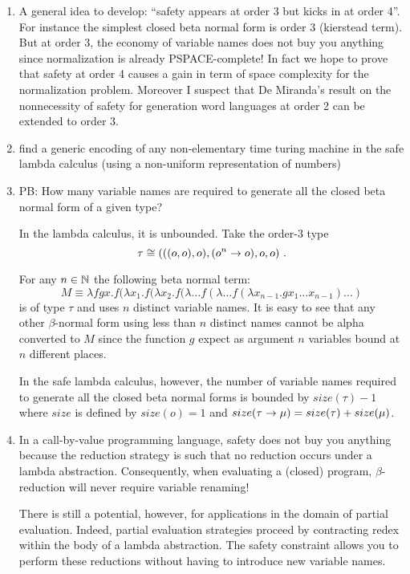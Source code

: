 \documentclass{article}
\begin{document}
\begin{enumerate}

\item A general idea to develop: ``safety appears at order 3 but kicks in at order 4''. For instance the simplest closed beta normal form is order 3 (kierstead term). But at order 3, the economy of variable names does not buy you anything since normalization is already PSPACE-complete! In fact we hope to prove that safety at order 4 causes a gain in term of space complexity for the normalization problem.
    Moreover I suspect that De Miranda's result on the nonnecessity of safety for generation word languages at order 2 can be extended to order 3.


\item find a generic encoding of any non-elementary time turing machine
in the safe lambda calculus (using a non-uniform representation of
numbers)


\item \label{safe_varnames} PB: How many variable names are required to generate all the
closed beta normal form of a given type?

In the lambda calculus, it is unbounded. Take the order-3 type
$$\tau
\cong (((o,o),o), (o^n\rightarrow o), o, o) \ . $$

For any $n\in\mathbb{N}$ the following beta normal term:
$$ M \equiv \lambda f g x . f (\lambda x_1.f(\lambda x_2.f(\lambda \ldots f(\lambda \ldots f(\lambda x_{n-1}.g x_1 \ldots x_{n-1}) \ldots )$$
is of type $\tau$ and uses $n$ distinct variable names. It is easy to see that
any other $\beta$-normal form using less than $n$ distinct names cannot be alpha converted to $M$
since the function $g$ expect as argument $n$ variables bound at $n$ different places.


In the safe lambda calculus, however, the number of variable names
required to generate all the closed beta normal forms is bounded by
$size(\tau)-1$ where $size$ is defined by $size(o)= 1$ and
$size(\tau\rightarrow\mu) = size(\tau) + size(\mu)$.


\item In a call-by-value programming language, safety does not buy you anything because the reduction strategy is such that no reduction occurs under a lambda abstraction. Consequently, when evaluating a (closed) program, $\beta$-reduction will never require variable renaming!

    There is still a potential, however, for applications in the domain of partial evaluation. Indeed, partial evaluation strategies proceed by contracting redex within the body of a lambda abstraction. The safety constraint allows you to perform these reductions without having to introduce new variable names.
\end{enumerate}
\end{document}
